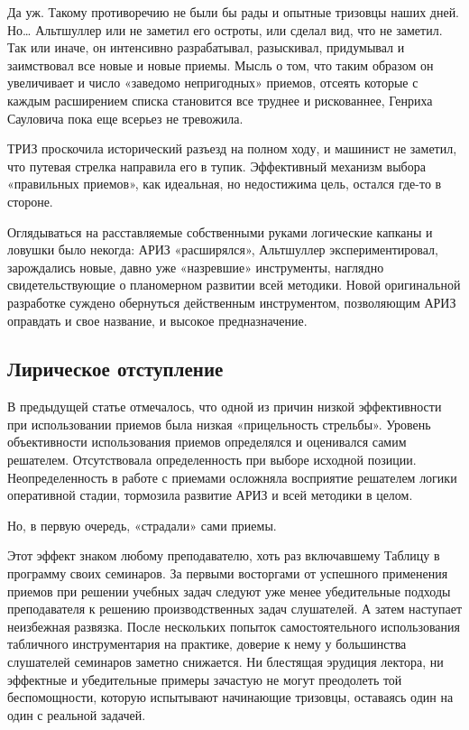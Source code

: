 \documentclass[11pt,a4paper]{article}
\begin{document}
Да уж. Такому противоречию не были бы рады и опытные тризовцы наших дней. Но…
Альтшуллер или не заметил его остроты, или сделал вид, что не заметил. Так или
иначе, он интенсивно разрабатывал, разыскивал, придумывал и заимствовал все
новые и новые приемы. Мысль о том, что таким образом он увеличивает и число
«заведомо непригодных» приемов, отсеять которые с каждым расширением списка
становится все труднее и рискованнее, Генриха Сауловича пока еще всерьез не
тревожила.

ТРИЗ проскочила исторический разъезд на полном ходу, и машинист не заметил,
что путевая стрелка направила его в тупик. Эффективный механизм выбора
«правильных приемов», как идеальная, но недостижима цель, остался где-то в
стороне.

Оглядываться на расставляемые собственными руками логические капканы и ловушки
было некогда: АРИЗ «расширялся», Альтшуллер экспериментировал, зарождались
новые, давно уже «назревшие» инструменты, наглядно свидетельствующие о
планомерном развитии всей методики. Новой оригинальной разработке суждено
обернуться действенным инструментом, позволяющим АРИЗ оправдать и свое
название, и высокое предназначение.

\subsection*{Лирическое отступление}

В предыдущей статье отмечалось, что одной из причин низкой эффективности при
использовании приемов была низкая «прицельность стрельбы». Уровень
объективности использования приемов определялся и оценивался самим решателем.
Отсутствовала определенность при выборе исходной позиции. Неопределенность в
работе с приемами осложняла восприятие решателем логики оперативной стадии,
тормозила развитие АРИЗ и всей методики в целом.

Но, в первую очередь, «страдали» сами приемы.

Этот эффект знаком любому преподавателю, хоть раз включавшему Таблицу в
программу своих семинаров. За первыми восторгами от успешного применения
приемов при решении учебных задач следуют уже менее убедительные подходы
преподавателя к решению производственных задач слушателей. А затем наступает
неизбежная развязка. После нескольких попыток самостоятельного использования
табличного инструментария на практике, доверие к нему у большинства слушателей
семинаров заметно снижается. Ни блестящая эрудиция лектора, ни эффектные и
убедительные примеры зачастую не могут преодолеть той беспомощности, которую
испытывают начинающие тризовцы, оставаясь один на один с реальной задачей.
\end{document}
